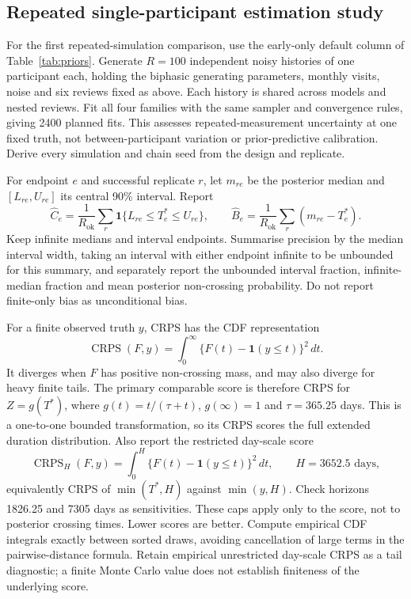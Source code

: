 \documentclass[11pt,a4paper]{article}
\begin{document}
\subsection*{Repeated single-participant estimation study}

For the first repeated-simulation comparison, use the early-only default
column of Table~\ref{tab:priors}. Generate $R=100$ independent noisy
histories of one participant each, holding the biphasic generating
parameters, monthly visits, noise and six reviews fixed as above. Each
history is shared across models and nested reviews. Fit all four families
with the same sampler and convergence rules, giving 2400 planned fits.
This assesses repeated-measurement uncertainty at one fixed truth, not
between-participant variation or prior-predictive calibration. Derive every
simulation and chain seed from the design and replicate.

For endpoint $e$ and successful replicate $r$, let $m_{re}$ be the posterior
median and $[L_{re},U_{re}]$ its central 90\% interval. Report
\begin{equation}
  \widehat C_e=\frac1{R_{\mathrm{ok}}}\sum_r
    \mathbf1\{L_{re}\leq T_e^*\leq U_{re}\},\qquad
  \widehat B_e=\frac1{R_{\mathrm{ok}}}\sum_r(m_{re}-T_e^*).
\end{equation}
Keep infinite medians and interval endpoints. Summarise precision by the
median interval width, taking an interval with either endpoint infinite
to be unbounded for this summary, and separately report the unbounded
interval fraction, infinite-median fraction and mean posterior non-crossing
probability. Do not report finite-only bias as unconditional bias.

For a finite observed truth $y$, CRPS has the CDF representation
\parencite{gneiting2007}
\begin{equation}
  \operatorname{CRPS}(F,y)=\int_0^\infty
    \{F(t)-\mathbf1(y\leq t)\}^2\,dt.
\end{equation}
It diverges when $F$ has positive non-crossing mass, and may also diverge
for heavy finite tails. The primary comparable score is therefore CRPS
for $Z=g(T^*)$, where $g(t)=t/(\tau+t)$, $g(\infty)=1$ and
$\tau=365.25$ days. This is a one-to-one bounded transformation, so its
CRPS scores the full extended duration distribution. Also report the
restricted day-scale score
\begin{equation}
  \operatorname{CRPS}_{H}(F,y)=\int_0^H
    \{F(t)-\mathbf1(y\leq t)\}^2\,dt,
  \qquad H=3652.5\text{ days},
\end{equation}
equivalently CRPS of $\min(T^*,H)$ against $\min(y,H)$. Check horizons
1826.25 and 7305 days as sensitivities. These caps apply only to the score,
not to posterior crossing times. Lower scores are better. Compute empirical
CDF integrals exactly between sorted draws, avoiding cancellation of large
terms in the pairwise-distance formula. Retain empirical unrestricted
day-scale CRPS as a tail diagnostic; a finite Monte Carlo value does not
establish finiteness of the underlying score.
\end{document}
